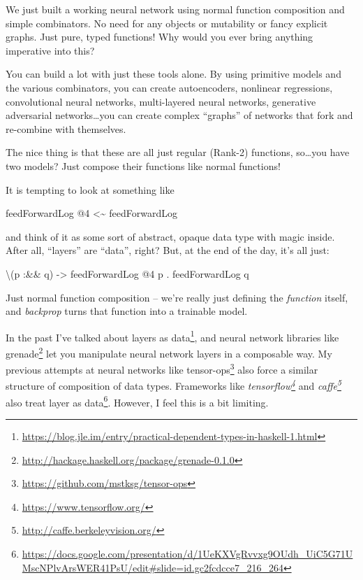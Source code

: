 \documentclass[]{article}
\newenvironment{Shaded}{}{}
\newcommand{\DecValTok}[1]{\textcolor[rgb]{0.25,0.63,0.44}{#1}}
\newcommand{\NormalTok}[1]{#1}
\newcommand{\OperatorTok}[1]{\textcolor[rgb]{0.40,0.40,0.40}{#1}}
\newcommand{\OtherTok}[1]{\textcolor[rgb]{0.00,0.44,0.13}{#1}}
\renewcommand{\href}[2]{#2\footnote{\url{#1}}}
\begin{document}
We just built a working neural network using normal function composition and
simple combinators. No need for any objects or mutability or fancy explicit
graphs. Just pure, typed functions! Why would you ever bring anything imperative
into this?

You can build a lot with just these tools alone. By using primitive models and
the various combinators, you can create autoencoders, nonlinear regressions,
convolutional neural networks, multi-layered neural networks, generative
adversarial networks\ldots you can create complex ``graphs'' of networks that
fork and re-combine with themselves.

The nice thing is that these are all just regular (Rank-2) functions,
so\ldots you have two models? Just compose their functions like normal
functions!

It is tempting to look at something like

\begin{Shaded}
\begin{Highlighting}[]
\NormalTok{feedForwardLog }\OperatorTok{@}\DecValTok{4} \OperatorTok{\textless{}\textasciitilde{}}\NormalTok{ feedForwardLog}
\end{Highlighting}
\end{Shaded}

and think of it as some sort of abstract, opaque data type with magic inside.
After all, ``layers'' are ``data'', right? But, at the end of the day, it's all
just:

\begin{Shaded}
\begin{Highlighting}[]
\NormalTok{\textbackslash{}(p }\OperatorTok{:\&\&}\NormalTok{ q) }\OtherTok{{-}\textgreater{}}\NormalTok{ feedForwardLog }\OperatorTok{@}\DecValTok{4}\NormalTok{ p }\OperatorTok{.}\NormalTok{ feedForwardLog q}
\end{Highlighting}
\end{Shaded}

Just normal function composition -- we're really just defining the
\emph{function} itself, and \emph{backprop} turns that function into a trainable
model.

In the past I've talked about
\href{https://blog.jle.im/entry/practical-dependent-types-in-haskell-1.html}{layers
as data}, and neural network libraries like
\href{http://hackage.haskell.org/package/grenade-0.1.0}{grenade} let you
manipulate neural network layers in a composable way. My previous attempts at
neural networks like \href{https://github.com/mstksg/tensor-ops}{tensor-ops}
also force a similar structure of composition of data types. Frameworks like
\emph{\href{https://www.tensorflow.org/}{tensorflow}} and
\emph{\href{http://caffe.berkeleyvision.org/}{caffe}} also treat
\href{https://docs.google.com/presentation/d/1UeKXVgRvvxg9OUdh_UiC5G71UMscNPlvArsWER41PsU/edit\#slide=id.gc2fcdcce7_216_264}{layer
as data}. However, I feel this is a bit limiting.
\end{document}
